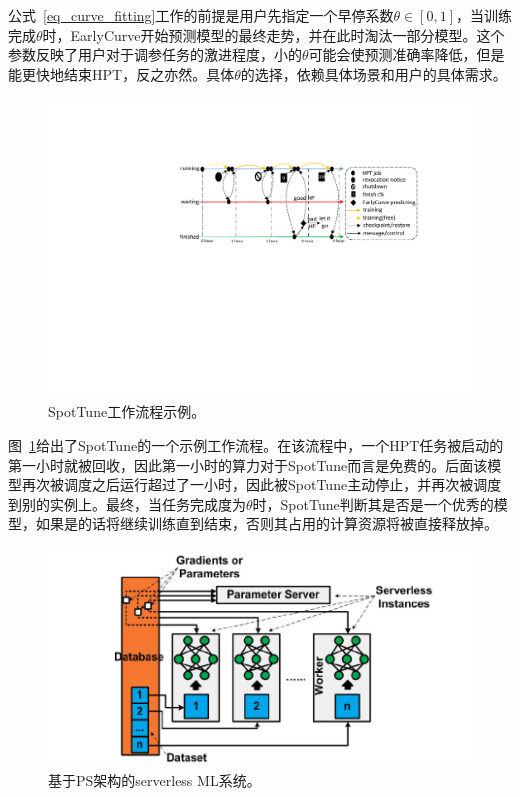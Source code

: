 公式~\ref{eq_curve_fitting}工作的前提是用户先指定一个早停系数$\theta \in [0, 1]$，当训练完成$\theta$时，EarlyCurve开始预测模型的最终走势，并在此时淘汰一部分模型。这个参数反映了用户对于调参任务的激进程度，小的$\theta$可能会使预测准确率降低，但是能更快地结束HPT，反之亦然。具体$\theta$的选择，依赖具体场景和用户的具体需求。

\begin{figure}[h]
    \centerline{\includegraphics[width=\textwidth]{figures/example_workflow_fat_v4.pdf}}
    \caption{SpotTune工作流程示例。}
    \label{example_spottune}
\end{figure}

图~\ref{example_spottune}给出了SpotTune的一个示例工作流程。在该流程中，一个HPT任务被启动的第一小时就被回收，因此第一小时的算力对于SpotTune而言是免费的。后面该模型再次被调度之后运行超过了一小时，因此被SpotTune主动停止，并再次被调度到别的实例上。最终，当任务完成度为$\theta$时，SpotTune判断其是否是一个优秀的模型，如果是的话将继续训练直到结束，否则其占用的计算资源将被直接释放掉。

\begin{figure}[h]
    \centerline{\includegraphics[width=\textwidth]{figures/data-para-faas-ml.png}}
    \caption{基于PS架构的serverless ML系统。}
    \label{data_para_faas_ml}
\end{figure}

